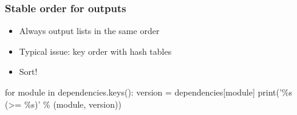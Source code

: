 \documentclass[14pt,aspectratio=169]{beamer}
\begin{document}
\begin{frame}[plain]
\end{frame}

\begin{frame}[fragile]
 \frametitle{Stable order for outputs}

 \begin{itemize}
  \item Always output lists in the same order
  \item Typical issue: key order with hash tables
  \item<2> Sort!
 \end{itemize}

 \begin{example}
\begin{semiverbatim}
for module in dependencies.keys():
    version = dependencies[module]
    print('\%s (>= \%s)' \% (module, version))
\end{semiverbatim}
 \end{example}
\end{frame}
\end{document}
